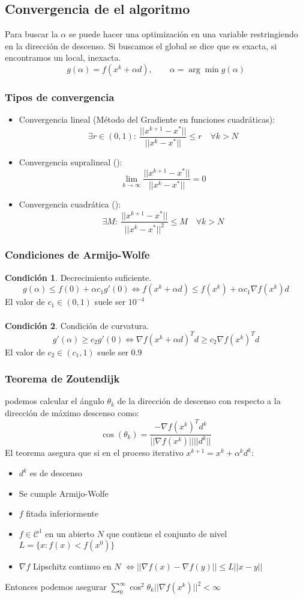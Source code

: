 \documentclass{myclass}
\newcommand{\norm}[1]{\lvert \lvert #1 \rvert \rvert }
\newcommand{\N}{\nabla}
\begin{document}
\subsection{Convergencia de el algoritmo}
Para buscar la $\alpha$ se puede hacer una optimización en una variable restringiendo en la dirección de descenso. Si buscamos el global se dice que es exacta, si encontramos un local, inexacta.
$$
g(\alpha) = f(x^k + \alpha d), \qquad \alpha = \arg \min g(\alpha)
$$

\subsubsection{Tipos de convergencia}
\begin{itemize}
    \item Convergencia lineal (Método del Gradiente en funciones cuadráticas):
        $$
        \exists r\in (0, 1): \ \frac{\norm{x^{k+1} - x^*}}{\norm{x^k - x^*}}\leq r \quad \forall k>N
        $$ 
    \item Convergencia supralineal ():
        $$
        \lim_{k\to \infty} \frac{\norm{x^{k+1} - x^*}}{\norm{x^k - x^*}} = 0
        $$ 
    \item Convergencia cuadrática ():
        $$
        \exists M: \ \frac{\norm{x^{k+1} - x^*}}{\norm{x^k - x^*}^2}\leq M \quad \forall k>N
        $$ 
\end{itemize}

\subsubsection{Condiciones de Armijo-Wolfe}
\textbf{Condición 1}. Decrecimiento suficiente.
$$
g(\alpha) \leq f(0) + \alpha c_1g'(0) \iff f(x^k + \alpha d) \leq f(x^k) + \alpha c_1\N f(x^k)d
$$
El valor de $c_1 \in (0,1 )$ suele ser $10^{-4}$\\
\\
\textbf{Condición 2}. Condición de curvatura.
$$
g'(\alpha) \geq c_2g'(0) \iff \N f(x^k + \alpha d)^Td \geq c_2\N f(x^k)^Td
$$
El valor de $c_2 \in (c_1,1 )$ suele ser $0.9$

\subsubsection{Teorema de Zoutendijk}
podemos calcular el ángulo $\theta_k$ de la dirección de descenso con respecto a la dirección de máximo descenso como:
$$
\cos(\theta_k) = \frac{-\N f(x^k)^Td^k}{\norm{\N f(x^k)}\norm{d^k}}
$$
El teorema asegura que si en el proceso iterativo $x^{k+1} = x^k + \alpha^kd^k$:
\begin{itemize}
    \item $d^k$ es de descenso
    \item Se cumple Armijo-Wolfe
    \item $f$ fitada inferiormente
    \item $f\in \mathcal{C}^1$ en un abierto $N$ que contiene el conjunto de nivel $L = \{x : f(x)<f(x^0)\}$
    \item $\N f$ Lipschitz continuo en $N$ $\iff \norm{\N f(x) - \N f(y)} \leq L\norm{x-y}$
\end{itemize}
Entonces podemos asegurar $\displaystyle \sum_0^\infty \cos^2\theta_k\norm{\N f(x^k)}^2<\infty$
\end{document}
